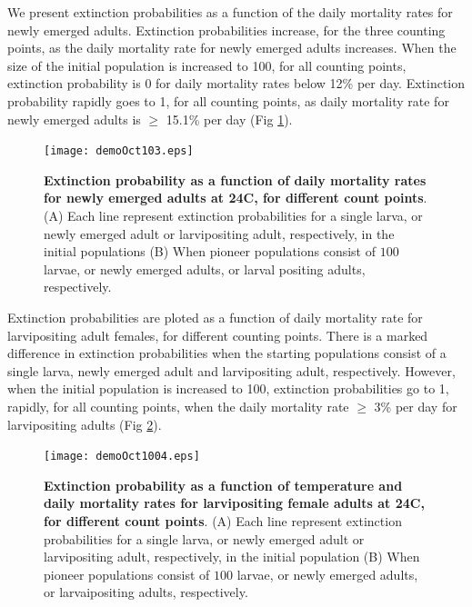 \documentclass[smallextended]{svjour3}
\begin{document}
We present extinction probabilities as a function of the daily mortality rates for newly emerged adults. Extinction probabilities increase, for the three counting points, as the daily mortality rate for newly emerged adults increases. When the size of the initial population is increased to 100, for all counting points, extinction probability is 0 for daily mortality rates below 12\% per day. Extinction probability rapidly goes to 1, for all counting points, as daily mortality rate for newly emerged adults is $\geq$ 15.1\% per day (Fig \ref{fig:4}).
   


\begin{figure}[h]
	\texttt{[image: demoOct103.eps]}
	\caption{{\bf Extinction probability as a function of daily mortality rates for newly emerged adults at 24\degree C, for different count points}. (A) Each line represent extinction probabilities for a single larva, or  newly emerged adult or larvipositing adult, respectively,  in the initial populations (B) When pioneer populations consist of  $100$ larvae,  or newly emerged adults, or larval positing adults, respectively.}
	\label{fig:4}       %
\end{figure}
%

\newpage

Extinction probabilities are ploted as a function of daily mortality rate for larvipositing adult females, for different counting points. There is a marked difference in extinction probabilities when the starting populations consist of a single larva, newly emerged adult and larvipositing adult, respectively. However, when the initial population is increased to 100, extinction probabilities go to 1, rapidly, for all counting points, when the daily mortality rate $\geq$ 3\% per day for larvipositing adults (Fig \ref{fig:5}). 



 \begin{figure}[h]
 	\texttt{[image: demoOct1004.eps]}
 	\caption{{\bf Extinction probability as a function of temperature and daily mortality rates for larvipositing female adults at 24\degree C, for different count points}. (A) Each line represent extinction probabilities for a single larva, or  newly emerged adult or larvipositing adult, respectively, in the initial population (B) When pioneer populations consist of  $100$ larvae,  or  newly emerged adults, or larvaipositing adults, respectively.}
 	\label{fig:5}       %
 \end{figure}
 
\end{document}
